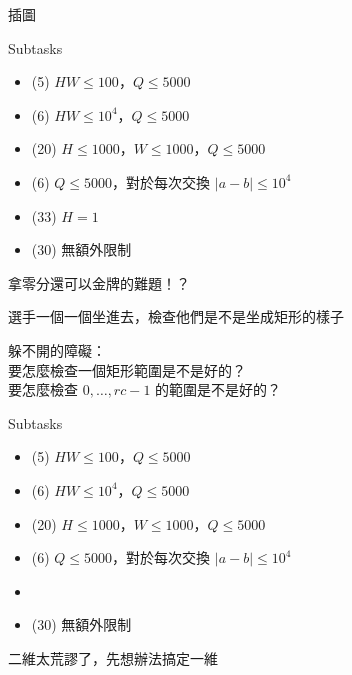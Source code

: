 \begin{frame}{}
    \todo 插圖
\end{frame}

\begin{frame}{}
    \begin{problem}
        Subtasks

        \begin{itemize}
            \item (5) $HW \le 100$，$Q \le 5000$
            \item (6) $HW \le 10^4$，$Q \le 5000$
            \item (20) $H \le 1000$，$W \le 1000$，$Q \le 5000$
            \item (6) $Q \le 5000$，對於每次交換 $|a - b| \le 10^4$
            \item (33) $H = 1$
            \item (30) 無額外限制
        \end{itemize}
    \end{problem}
    
    拿零分還可以金牌的難題！？
\end{frame}

\begin{frame}{}
    選手一個一個坐進去，檢查他們是不是坐成矩形的樣子

    躲不開的障礙：\\
    要怎麼檢查一個矩形範圍是不是好的？\\
    要怎麼檢查 $0, \dots, rc - 1$ 的範圍是不是好的？
\end{frame}

\begin{frame}{}
    \begin{problem}
        Subtasks

        \begin{itemize}
            \item (5) $HW \le 100$，$Q \le 5000$
            \item (6) $HW \le 10^4$，$Q \le 5000$
            \item (20) $H \le 1000$，$W \le 1000$，$Q \le 5000$
            \item (6) $Q \le 5000$，對於每次交換 $|a - b| \le 10^4$
            \item {}
            \item (30) 無額外限制
        \end{itemize}
    \end{problem}

    二維太荒謬了，先想辦法搞定一維

\end{frame}

